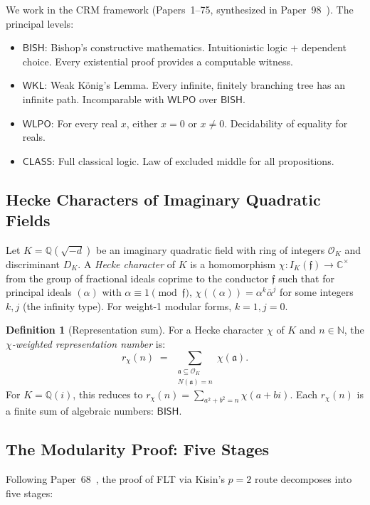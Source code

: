 \documentclass[11pt,a4paper]{article}
\theoremstyle{plain}
\theoremstyle{definition}
\newtheorem{definition}[theorem]{Definition}
\newcommand{\BISH}{\textsf{BISH}}
\newcommand{\WKL}{\textsf{WKL}}
\newcommand{\WLPO}{\textsf{WLPO}}
\newcommand{\CLASS}{\textsf{CLASS}}
\newcommand{\Q}{\mathbb{Q}}
\newcommand{\C}{\mathbb{C}}
\newcommand{\N}{\mathbb{N}}
\begin{document}
We work in the CRM framework (Papers~1--75, synthesized in Paper~98~\cite{lee-p98}). The principal levels:
\begin{itemize}[leftmargin=2em]
\item $\BISH$: Bishop's constructive mathematics. Intuitionistic logic + dependent choice. Every existential proof provides a computable witness.
\item $\WKL$: Weak K\"onig's Lemma. Every infinite, finitely branching tree has an infinite path. Incomparable with $\WLPO$ over $\BISH$.
\item $\WLPO$: For every real $x$, either $x = 0$ or $x \neq 0$. Decidability of equality for reals.
\item $\CLASS$: Full classical logic. Law of excluded middle for all propositions.
\end{itemize}

\subsection{Hecke Characters of Imaginary Quadratic Fields}

Let $K = \Q(\sqrt{-d})$ be an imaginary quadratic field with ring of integers $\mathcal{O}_K$ and discriminant $D_K$. A \emph{Hecke character} of $K$ is a homomorphism $\chi : I_K(\mathfrak{f}) \to \C^\times$ from the group of fractional ideals coprime to the conductor $\mathfrak{f}$ such that for principal ideals $(\alpha)$ with $\alpha \equiv 1 \pmod{\mathfrak{f}}$, $\chi((\alpha)) = \alpha^k \bar{\alpha}^j$ for some integers $k, j$ (the infinity type). For weight-1 modular forms, $k = 1, j = 0$.

\begin{definition}[Representation sum]\label{def:rchi}
For a Hecke character $\chi$ of $K$ and $n \in \N$, the \emph{$\chi$-weighted representation number} is:
\[
r_\chi(n) \;=\; \sum_{\substack{\mathfrak{a} \subseteq \mathcal{O}_K \\ N(\mathfrak{a}) = n}} \chi(\mathfrak{a}).
\]
For $K = \Q(i)$, this reduces to $r_\chi(n) = \sum_{a^2 + b^2 = n} \chi(a + bi)$.
Each $r_\chi(n)$ is a finite sum of algebraic numbers: $\BISH$.
\end{definition}

\subsection{The Modularity Proof: Five Stages}

Following Paper~68~\cite{lee-p68}, the proof of FLT via Kisin's $p = 2$ route decomposes into five stages:
\end{document}
